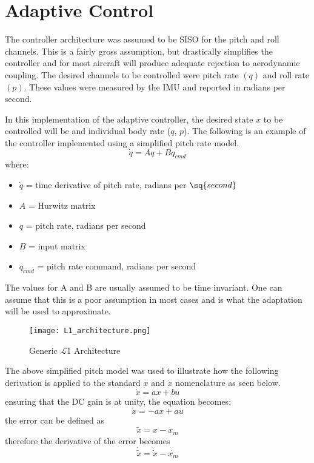 \section{\Lone Adaptive Control}
The \Lone controller architecture was assumed to be \ac{SISO} for the pitch and roll channels.  This is a fairly gross assumption, but drastically simplifies the controller and for most aircraft will produce adequate rejection to aerodynamic coupling.  The desired channels to be controlled were pitch rate $(q)$ and roll rate $(p)$.  These values were measured by the \ac{IMU} and reported in radians per second.

In this implementation of the \Lone adaptive controller, the desired state $x$ to be controlled will be and individual body rate (\eg $q$, $p$).
The following is an example of the controller implemented using a simplified pitch rate model.
\begin{equation}
\dot{q}=Aq+Bq_{cmd}
\end{equation}
where: 
\begin{itemize}
	\item[] $\dot{q}$ = time derivative of pitch rate, radians per $\sq{second}$
	\item[] $A$ = Hurwitz matrix
	\item[] $q$ = pitch rate, radians per second
	\item[] $B$ = input matrix
	\item[] $q_{cmd}$ = pitch rate command, radians per second
\end{itemize}
The values for A and B are usually assumed to be time invariant.  One can assume that this is a poor assumption in most cases and is what the adaptation will be used to approximate.  

\begin{figure}[!h]
 \centering
  \texttt{[image: L1\_architecture.png]}
  \caption{Generic $\mathcal{L}$1 Architecture}
  \label{fig:l1_architecture}
\end{figure}

The above simplified pitch model was used to illustrate how the following derivation is applied to the standard $x$ and $\dot{x}$ nomenclature as seen below.
\begin{equation}
\dot{x} =ax+bu
\end{equation}
ensuring that the DC gain is at unity, the equation becomes:
\begin{equation}
\dot{x} =-ax+au
\end{equation}
the error can be defined as
\begin{equation}
\tilde{x}=x-x_m
\end{equation}
therefore the derivative of the error becomes
\begin{equation}
\dot{\tilde{x}}=\dot{x}-\dot{x_m}
\end{equation}









